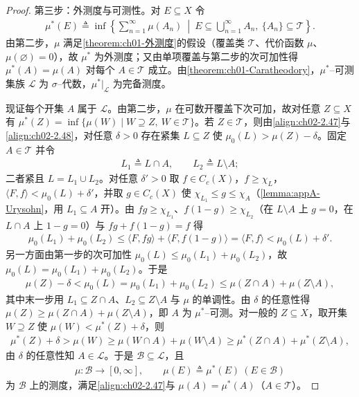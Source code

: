 \documentclass[../../main.tex]{subfiles}%
\begin{document}
\begin{proof}
第三步：外测度与可测性。对 $E\subseteq X$ 令
\begin{align*}
\mu^*(E)\triangleq\inf\left\{\sum_{n=1}^\infty\mu(A_n)\ \middle|\ E\subseteq\bigcup_{n=1}^\infty A_n,\ \{A_n\}\subseteq\mathscr T\right\}.
\end{align*}
由第二步，$\mu$ 满足\cref{theorem:ch01-外测度}的假设（覆盖类 $\mathscr T$、代价函数 $\mu$、$\mu(\varnothing)=0$），故 $\mu^*$ 为外测度；又由单项覆盖与第二步的次可加性得 $\mu^*(A)=\mu(A)$ 对每个 $A\in\mathscr T$ 成立。由\cref{theorem:ch01-Caratheodory}，$\mu^*$--可测集族 $\mathscr L$ 为 $\sigma$--代数，$\mu^*|_{\mathscr L}$ 为完备测度。

现证每个开集 $A$ 属于 $\mathscr L$。由第二步，$\mu$ 在可数开覆盖下次可加，故对任意 $Z\subseteq X$ 有 $\mu^*(Z)=\inf\{\mu(W)\mid W\supseteq Z,\ W\in\mathscr T\}$。若 $Z\in\mathscr T$，则由\eqref{align:ch02-2.47}与\eqref{align:ch02-2.48}，对任意 $\delta>0$ 存在紧集 $L\subseteq Z$ 使 $\mu_0(L)>\mu(Z)-\delta$。固定 $A\in\mathscr T$ 并令
\begin{align*}
L_1\triangleq L\cap A,\qquad L_2\triangleq L\setminus A;
\end{align*}
二者紧且 $L=L_1\cup L_2$。对任意 $\delta'>0$ 取 $f\in C_c(X)$，$f\geqslant\chi_L$，$\langle F,f\rangle<\mu_0(L)+\delta'$，并取 $g\in C_c(X)$ 使 $\chi_{L_1}\leqslant g\leqslant\chi_A$（\cref{lemma:appA-Urysohn}，用 $L_1\subseteq A$ 开）。由 $fg\geqslant\chi_{L_1}$、$f(1-g)\geqslant\chi_{L_2}$（在 $L\setminus A$ 上 $g=0$，在 $L\cap A$ 上 $1-g=0$）与 $fg+f(1-g)=f$ 得
\begin{align*}
\mu_0(L_1)+\mu_0(L_2)\leqslant\langle F,fg\rangle+\langle F,f(1-g)\rangle=\langle F,f\rangle<\mu_0(L)+\delta'.
\end{align*}
另一方面由第一步的次可加性 $\mu_0(L)\leqslant\mu_0(L_1)+\mu_0(L_2)$，故 $\mu_0(L)=\mu_0(L_1)+\mu_0(L_2)$。于是
\begin{align*}
\mu(Z)-\delta<\mu_0(L)=\mu_0(L_1)+\mu_0(L_2)\leqslant\mu(Z\cap A)+\mu(Z\setminus A),
\end{align*}
其中末一步用 $L_1\subseteq Z\cap A$、$L_2\subseteq Z\setminus A$ 与 $\mu$ 的单调性。由 $\delta$ 的任意性得 $\mu(Z)\geqslant\mu(Z\cap A)+\mu(Z\setminus A)$，即 $A$ 为 $\mu^*$--可测。对一般的 $Z\subseteq X$，取开集 $W\supseteq Z$ 使 $\mu(W)<\mu^*(Z)+\delta$，则
\begin{align*}
\mu^*(Z)+\delta>\mu(W)\geqslant\mu(W\cap A)+\mu(W\setminus A)\geqslant\mu^*(Z\cap A)+\mu^*(Z\setminus A),
\end{align*}
由 $\delta$ 的任意性知 $A\in\mathscr L$。于是 $\mathscr B\subseteq\mathscr L$，且
\begin{align*}
\mu:\mathscr B\to[0,\infty],\qquad\mu(E)\triangleq\mu^*(E)\ (E\in\mathscr B)
\end{align*}
为 $\mathscr B$ 上的测度，满足\eqref{align:ch02-2.47}与 $\mu(A)=\mu^*(A)$（$A\in\mathscr T$）。


\end{proof}
\end{document}
